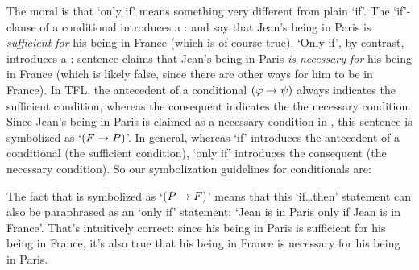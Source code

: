 The moral is that `only if' means something very different from plain `if'.  The `if'-clause of a conditional introduces a :  and  say that Jean's being in Paris is \emph{sufficient for} his being in France (which is of course true).  `Only if', by contrast, introduces a : sentence  claims that Jean's being in Paris \emph{is necessary for} his being in France (which is likely false, since there are other ways for him to be in France). In TFL, the antecedent \meta{\varphi} of a conditional $(\mathcal{\varphi} \rightarrow \mathcal{\psi})$ always indicates the sufficient condition, whereas the consequent \meta{\psi} indicates the the necessary condition.  Since Jean's being in Paris is claimed as a necessary condition in , this sentence is symbolized as `$(F \rightarrow P)$'.  In general, whereas `if' introduces the antecedent of a conditional (the sufficient condition), `only if' introduces the consequent (the necessary condition).  So our symbolization guidelines for conditionals are:


The fact that  is symbolized as `$(P \rightarrow F)$' means that this `if\ldots then' statement can also be paraphrased as an `only if' statement: `Jean is in Paris only if Jean is in France'.  That's intuitively correct: since his being in Paris is sufficient for his being in France, it's also true that his being in France is necessary for his being in Paris.

